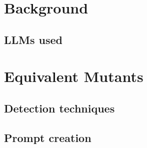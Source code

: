 \begin{chapterabstract}
\end{chapterabstract}

\section{Background}

\subsection{LLMs used}

\section{Equivalent Mutants}

\subsection{Detection techniques}

\subsection{Prompt creation}

